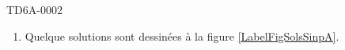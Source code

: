 \begin{corrige}{TD6A-0002}
\begin{enumerate}
        \item

            Quelque solutions sont dessinées à la figure \ref{LabelFigSolsSinpA}.
            \newcommand{\CaptionFigSolsSinpA}{Des solutions pour l'équation différentielle de l'exercice \ref{exoTD6A-0002}.}
            

    \end{enumerate}
  
\end{corrige}
